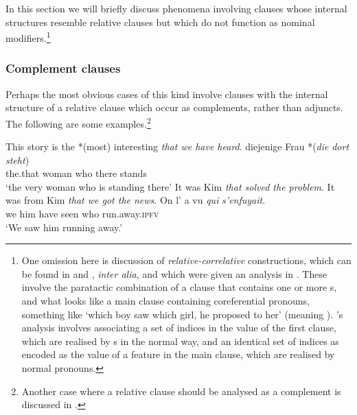 \documentclass[output=paper,biblatex,babelshorthands,newtxmath,draftmode,colorlinks,citecolor=brown]{langscibook}
\begin{document}
In this section we will briefly discuss phenomena involving clauses whose internal
structures resemble relative clauses but which do not function as nominal
modifiers.\footnote{One omission here is discussion of \emph{relative-correlative} constructions,
  which can be found in  and , \emph{inter alia}, and which were given an
  analysis in . These involve the paratactic combination of
  a clause that contains one or more s, and what looks like a main clause
  containing coreferential pronouns, something like `which boy saw which girl, he proposed
  to her' (meaning ). \citeauthor{Pollard:Sag:94}'s analysis involves associating a set of
  indices in the  value of the first clause, which are realised by s in the
  normal way, and an identical set of indices as encoded as the value of a
   feature in the main clause, which
  are realised by normal pronouns.}

\subsubsection{Complement clauses}
\label{sec:rc-complement-clauses}

Perhaps the most obvious cases of this kind involve clauses with the internal structure of
a relative clause which occur as complements, rather than adjuncts. The following are some
examples.\footnote{Another case where a relative clause should be analysed as a complement
  is discussed in .
}
\begin{exe}\ex\begin{xlist}
\ex\label{x:rc-128} This story is the *(most) interesting \emph{that we have heard}.
\ex\label{x:rc-129}
\gll diejenige Frau *(\emph{die} \emph{dort} \emph{steht})\\ 
    the.that woman \hphantom{*(}who there stands\\
    \glt `the very woman who is standing there'
\ex\label{x:rc-130} It was Kim \emph{that solved the problem}.
\ex\label{x:rc-131} It was from Kim \emph{that we got the news}. 
\ex\label{x:rc-132} 
\gll On l' a  vu \emph{qui} \emph{s'enfuyait}.\\
     we him have seen who run.away.\textsc{ipfv}\\
\glt `We saw him running away.'
\end{xlist}\end{exe}
\end{document}
